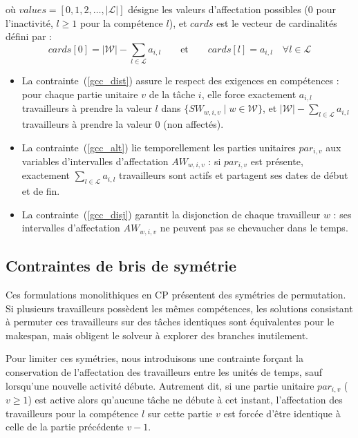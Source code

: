 où $values = [0, 1, 2, \dots, |\mathcal{L}|]$ désigne les valeurs d'affectation possibles ($0$ pour l'inactivité, $l \ge 1$ pour la compétence $l$), et $cards$ est le vecteur de cardinalités défini par :
\begin{equation}
    cards[0] = |\mathcal{W}| - \sum_{l \in \mathcal{L}} a_{i,l} \qquad \text{et} \qquad cards[l] = a_{i,l} \quad \forall l \in \mathcal{L}
    \label{gcc_cards}
\end{equation}

\begin{itemize}
    \item La contrainte~(\ref{gcc_dist}) assure le respect des exigences en compétences : pour chaque partie unitaire $v$ de la tâche $i$, elle force exactement $a_{i,l}$ travailleurs à prendre la valeur $l$ dans $\{SW_{w,i,v} \mid w \in \mathcal{W}\}$, et $|\mathcal{W}| - \sum_{l \in \mathcal{L}} a_{i,l}$ travailleurs à prendre la valeur $0$ (non affectés).
    \item La contrainte~(\ref{gcc_alt}) lie temporellement les parties unitaires $par_{i,v}$ aux variables d'intervalles d'affectation $AW_{w,i,v}$ : si $par_{i,v}$ est présente, exactement $\sum_{l \in \mathcal{L}} a_{i,l}$ travailleurs sont actifs et partagent ses dates de début et de fin.
    \item La contrainte~(\ref{gcc_disj}) garantit la disjonction de chaque travailleur $w$ : ses intervalles d'affectation $AW_{w,i,v}$ ne peuvent pas se chevaucher dans le temps.
\end{itemize}


\subsection{Contraintes de bris de symétrie}
Ces formulations monolithiques en CP présentent des symétries de permutation. Si plusieurs travailleurs possèdent les mêmes compétences, les solutions consistant à permuter ces travailleurs sur des tâches identiques sont équivalentes pour le makespan, mais obligent le solveur à explorer des branches inutilement.

\bigskip

Pour limiter ces symétries, nous introduisons une contrainte forçant la conservation de l'affecta\-tion des travailleurs entre les unités de temps, sauf lorsqu'une nouvelle activité débute. Autrement dit, si une partie unitaire $par_{i,v}$ ($v \geq 1$) est active alors qu'aucune tâche ne débute à cet instant, l'affectation des travailleurs pour la compétence $l$ sur cette partie $v$ est forcée d'être identique à celle de la partie précédente $v-1$.

